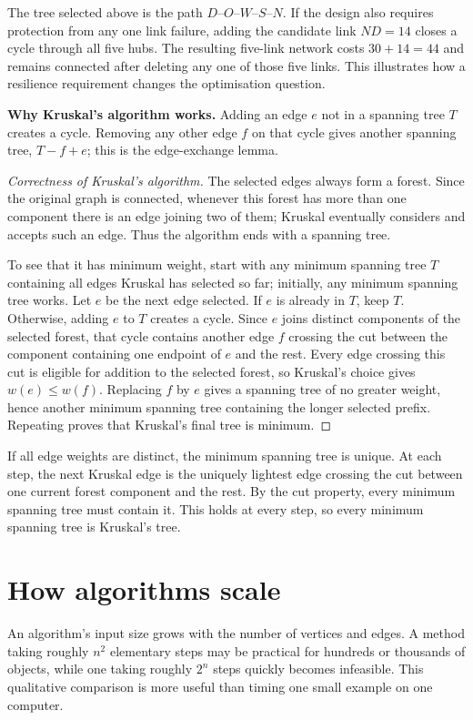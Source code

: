 The tree selected above is the path $D$--$O$--$W$--$S$--$N$. If the design also requires protection from any one link failure, adding the candidate link $ND=14$ closes a cycle through all five hubs. The resulting five-link network costs $30+14=44$ and remains connected after deleting any one of those five links. This illustrates how a resilience requirement changes the optimisation question.

\Enrichment{} \textbf{Why Kruskal's algorithm works.} Adding an edge $e$ not in a spanning tree $T$ creates a cycle. Removing any other edge $f$ on that cycle gives another spanning tree, $T-f+e$; this is the edge-exchange lemma.

\begin{proof}[Correctness of Kruskal's algorithm]
The selected edges always form a forest. Since the original graph is connected, whenever this forest has more than one component there is an edge joining two of them; Kruskal eventually considers and accepts such an edge. Thus the algorithm ends with a spanning tree.

To see that it has minimum weight, start with any minimum spanning tree $T$ containing all edges Kruskal has selected so far; initially, any minimum spanning tree works. Let $e$ be the next edge selected. If $e$ is already in $T$, keep $T$. Otherwise, adding $e$ to $T$ creates a cycle. Since $e$ joins distinct components of the selected forest, that cycle contains another edge $f$ crossing the cut between the component containing one endpoint of $e$ and the rest. Every edge crossing this cut is eligible for addition to the selected forest, so Kruskal's choice gives $w(e)\leq w(f)$. Replacing $f$ by $e$ gives a spanning tree of no greater weight, hence another minimum spanning tree containing the longer selected prefix. Repeating proves that Kruskal's final tree is minimum.
\end{proof}

\Enrichment{} If all edge weights are distinct, the minimum spanning tree is unique. At each step, the next Kruskal edge is the uniquely lightest edge crossing the cut between one current forest component and the rest. By the cut property, every minimum spanning tree must contain it. This holds at every step, so every minimum spanning tree is Kruskal's tree.

\section{How algorithms scale}
An algorithm's input size grows with the number of vertices and edges. A method taking roughly $n^2$ elementary steps may be practical for hundreds or thousands of objects, while one taking roughly $2^n$ steps quickly becomes infeasible. This qualitative comparison is more useful than timing one small example on one computer.

